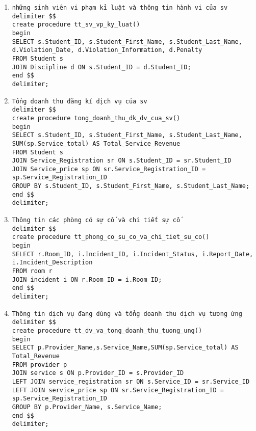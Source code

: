 \documentclass[a4paper,12pt]{article}
\begin{document}
\begin{enumerate}
\begin{verbatim}
     (SELECT COUNT(*) FROM Student s JOIN Renting r ON s.Student_ID = r.Student_ID WHERE r.Room_ID IN (SELECT Room_ID FROM Room WHERE Dorm_ID = d.Dorm_ID)) AS Total_Students,
     (SELECT COUNT(*) FROM Room WHERE Dorm_ID = d.Dorm_ID) AS Total_Rooms,
     (SELECT COUNT(*) FROM Staff WHERE Dorm_ID = d.Dorm_ID) AS Total_Staff
FROM Dorm as d
LIMIT 0, 1000;
end $$
delimiter;
\end{verbatim}
\item \begin{verbatim}
những sinh viên vi phạm kỉ luật và thông tin hành vi của sv
delimiter $$
create procedure tt_sv_vp_ky_luat()
begin
SELECT s.Student_ID, s.Student_First_Name, s.Student_Last_Name, d.Violation_Date, d.Violation_Information, d.Penalty
FROM Student s
JOIN Discipline d ON s.Student_ID = d.Student_ID;
end $$
delimiter;
\end{verbatim}
\item \begin{verbatim}
Tổng doanh thu đăng kí dịch vụ của sv
delimiter $$
create procedure tong_doanh_thu_dk_dv_cua_sv()
begin
SELECT s.Student_ID, s.Student_First_Name, s.Student_Last_Name, SUM(sp.Service_total) AS Total_Service_Revenue
FROM Student s
JOIN Service_Registration sr ON s.Student_ID = sr.Student_ID
JOIN Service_price sp ON sr.Service_Registration_ID = sp.Service_Registration_ID
GROUP BY s.Student_ID, s.Student_First_Name, s.Student_Last_Name;
end $$
delimiter;
\end{verbatim}
\item \begin{verbatim}
Thông tin các phòng có sự cố và chi tiết sự cố
delimiter $$
create procedure tt_phong_co_su_co_va_chi_tiet_su_co()
begin
SELECT r.Room_ID, i.Incident_ID, i.Incident_Status, i.Report_Date, i.Incident_Description
FROM room r
JOIN incident i ON r.Room_ID = i.Room_ID;
end $$
delimiter;
\end{verbatim}
\item \begin{verbatim}
Thông tin dịch vụ đang dùng và tổng doanh thu dịch vụ tương ứng
delimiter $$
create procedure tt_dv_va_tong_doanh_thu_tuong_ung()
begin
SELECT p.Provider_Name,s.Service_Name,SUM(sp.Service_total) AS Total_Revenue
FROM provider p
JOIN service s ON p.Provider_ID = s.Provider_ID
LEFT JOIN service_registration sr ON s.Service_ID = sr.Service_ID
LEFT JOIN service_price sp ON sr.Service_Registration_ID = sp.Service_Registration_ID
GROUP BY p.Provider_Name, s.Service_Name;
end $$
delimiter;
\end{verbatim}

\end{enumerate}
\end{document}
